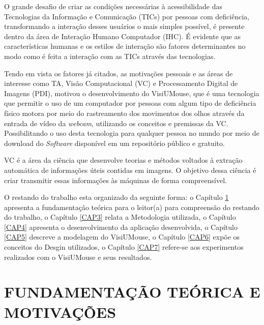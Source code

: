 O grande desafio de criar as condições necessárias à acessibilidade das Tecnologias da Informação e Comunicação (TICs) por pessoas com deficiência, transformando a interação desses usuários o mais simples possível, é presente dentro da área de Interação Humano Computador (IHC). É evidente que as características humanas e os estilos de interação são fatores determinantes no modo como é feita a interação com as TICs através das tecnologias.

Tendo em vista os fatores já citados, as motivações pessoais e as áreas de interesse como TA, Visão Computacional (VC) e Processamento Digital de Imagens (PDI), motivou o desenvolvimento do VisiUMouse, que é  uma tecnologia que permitir o uso de um computador  por pessoas com algum tipo de deficiência físico motora por meio do rastreamento dos movimentos dos olhos através da entrada de vídeo da \textit{webcam}, utilizando os conceitos e premissas da VC. Possibilitando o uso desta tecnologia para qualquer pessoa no mundo por meio de download do \textit{Software} disponível em um repositório público e gratuito.

VC é a área da ciência que desenvolve teorias e métodos voltados à extração automática de informações úteis contidas em imagens. O objetivo dessa ciência é criar transmitir essas informações às máquinas de forma compreensível.

O restando do trabalho esta organizado da seguinte forma: o Capítulo \ref{CAP2} apresenta a fundamentação teórica para o leitor(a) para compreensão do restando do trabalho, o Capítulo \ref{CAP3} relata a Metodologia utilizada, o Capítulo \ref{CAP4} apresenta o desenvolvimento da aplicação desenvolvida, o Capítulo \ref{CAP5} descreve a modelagem do VisiUMouse, o Capítulo \ref{CAP6} expõe os conceitos do Desgin utilizados, o Capítulo \ref{CAP7} refere-se aos experimentos realizados com o VisiUMouse e seus resultados. 

\chapter{FUNDAMENTAÇÃO TEÓRICA E MOTIVAÇÕES}
\label{CAP2}

